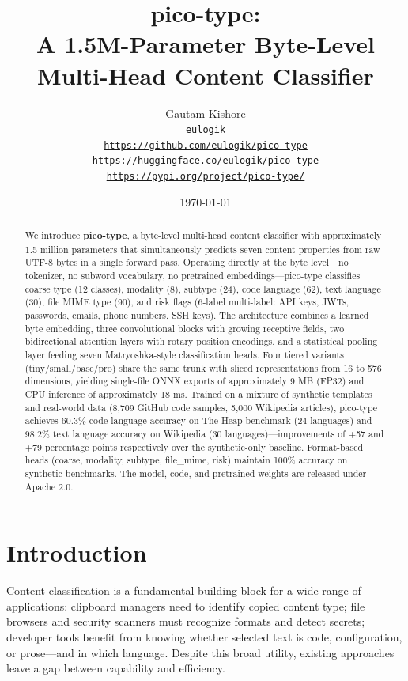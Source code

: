 \documentclass[11pt,a4paper]{article}
\title{\textbf{pico-type}: \\ A 1.5M-Parameter Byte-Level Multi-Head Content Classifier}
\author{%
  Gautam Kishore \\
  \texttt{eulogik} \\
  \texttt{\url{https://github.com/eulogik/pico-type}} \\
  \texttt{\url{https://huggingface.co/eulogik/pico-type}} \\
  \texttt{\url{https://pypi.org/project/pico-type/}}
}
\date{\today}
\begin{document}
\maketitle

\begin{abstract}
We introduce \textbf{pico-type}, a byte-level multi-head content classifier with approximately 1.5 million parameters that simultaneously predicts seven content properties from raw UTF-8 bytes in a single forward pass.
Operating directly at the byte level---no tokenizer, no subword vocabulary, no pretrained embeddings---pico-type classifies coarse type (12 classes), modality (8), subtype (24), code language (62), text language (30), file MIME type (90), and risk flags (6-label multi-label: API keys, JWTs, passwords, emails, phone numbers, SSH keys).
The architecture combines a learned byte embedding, three convolutional blocks with growing receptive fields, two bidirectional attention layers with rotary position encodings, and a statistical pooling layer feeding seven Matryoshka-style classification heads.
Four tiered variants (tiny/small/base/pro) share the same trunk with sliced representations from 16 to 576 dimensions, yielding single-file ONNX exports of approximately 9 MB (FP32) and CPU inference of approximately 18 ms.
Trained on a mixture of synthetic templates and real-world data (8,709 GitHub code samples, 5,000 Wikipedia articles), pico-type achieves 60.3\% code language accuracy on The Heap benchmark (24 languages) and 98.2\% text language accuracy on Wikipedia (30 languages)---improvements of +57 and +79 percentage points respectively over the synthetic-only baseline.
Format-based heads (coarse, modality, subtype, file\_mime, risk) maintain 100\% accuracy on synthetic benchmarks.
The model, code, and pretrained weights are released under Apache 2.0.
\end{abstract}

\section{Introduction}
\label{sec:introduction}

Content classification is a fundamental building block for a wide range of applications: clipboard managers need to identify copied content type; file browsers and security scanners must recognize formats and detect secrets; developer tools benefit from knowing whether selected text is code, configuration, or prose---and in which language.
Despite this broad utility, existing approaches leave a gap between capability and efficiency.
\end{document}
